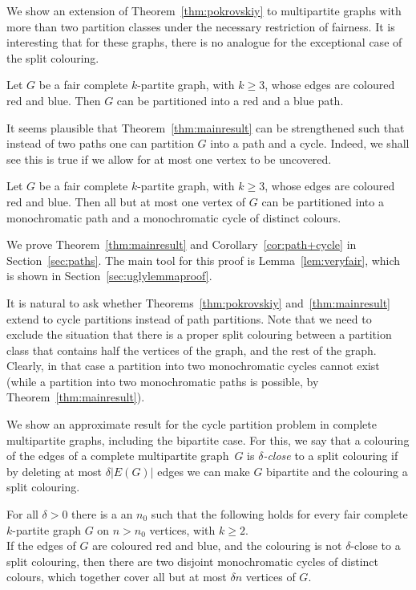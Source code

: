 \documentclass[a4paper,10pt]{article}
\begin{document}
We show an extension of Theorem~\ref{thm:pokrovskiy} to multipartite graphs with more than two partition classes under the necessary restriction of fairness. 
It is interesting that for these graphs,  there is no analogue for the exceptional case of the split colouring.

\begin{theorem}\label{thm:mainresult}
Let $G$ be a fair complete $k$-partite graph, with $k\geq 3$,
whose edges are coloured red and blue. Then $G$ can be partitioned into a red and a blue path. 
\end{theorem}

It seems plausible that Theorem~\ref{thm:mainresult} can be strengthened such that instead of two paths one can partition $G$ into a path and a cycle.
Indeed, we shall see this is true if we allow for at most one vertex to be uncovered.

\begin{corollary}\label{cor:path+cycle}
Let $G$ be a fair complete $k$-partite graph, with $k\geq 3$,
whose edges are coloured red and blue. Then all but at most one vertex of $G$ can be partitioned into a monochromatic path and a monochromatic cycle of distinct colours. 
\end{corollary}

We prove Theorem~\ref{thm:mainresult} and Corollary~\ref{cor:path+cycle} in Section~\ref{sec:paths}. The main tool for this proof is Lemma~\ref{lem:veryfair}, which is shown in Section~\ref{sec:uglylemmaproof}.

\medskip

It is natural to ask whether Theorems~\ref{thm:pokrovskiy} and~\ref{thm:mainresult} extend to cycle partitions instead of path partitions.
Note that we need to exclude the situation that there is a proper split colouring between a partition class that contains half the vertices of the graph, and the rest of the graph. Clearly, in that case a partition into two monochromatic cycles cannot exist (while a partition into two monochromatic paths is possible, by Theorem~\ref{thm:mainresult}).

We show an approximate result for the cycle partition problem in complete multipartite graphs, including the bipartite case.
For this, we say that a colouring of the edges of a complete multipartite graph~$G$ is {\it $\delta$-close} to a split colouring if by deleting at most $\delta |E(G)|$ edges we can make $G$ bipartite and the colouring a split colouring.

\begin{theorem}\label{thm:cycles}
For all $\delta>0$ there is a an $n_0$ such that the following holds for every  fair complete $k$-partite graph $G$ on $n>n_0$ vertices, with $k\geq 2$.\\ 
If the edges of $G$ are coloured red and blue, and the colouring is not $\delta$-close to a split colouring, then there are two disjoint monochromatic cycles of distinct colours,  which together cover all but at most $\delta n$ vertices of $G$.
\end{theorem}
\end{document}
